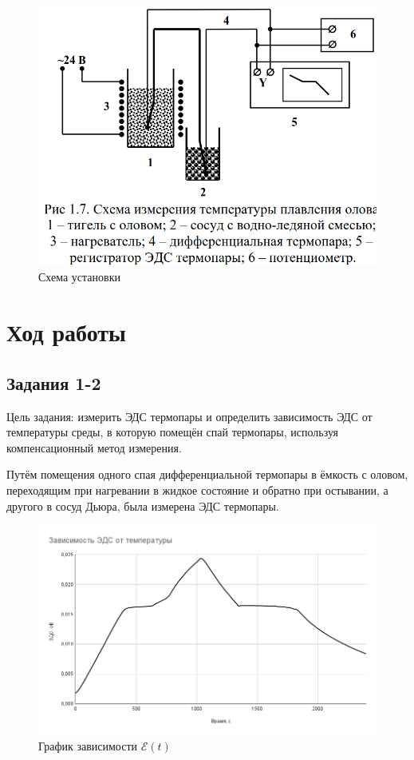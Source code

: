 \documentclass[a4paper,12pt]{article}
\begin{document}
\begin{figure}[ht!]
    \centering
    \includegraphics[scale=0.7]{scheme_1.png}
    \caption{Схема установки}
\end{figure}

\newpage
\section{Ход работы}
\subsection{Задания 1-2}
Цель задания:  измерить ЭДС термопары и определить зависимость ЭДС от температуры среды, в
которую помещён спай термопары, используя компенсационный метод измерения.

Путём помещения одного спая дифференциальной термопары в ёмкость с оловом, переходящим при нагревании в жидкое состояние и обратно при остывании, а другого в сосуд Дьюра, была измерена ЭДС термопары.

\begin{figure}[ht!]
    \centering
    \includegraphics[scale=0.5]{eds.png}
    \caption{График зависимости $\mathcal{E}(t)$}
\end{figure}
\end{document}
